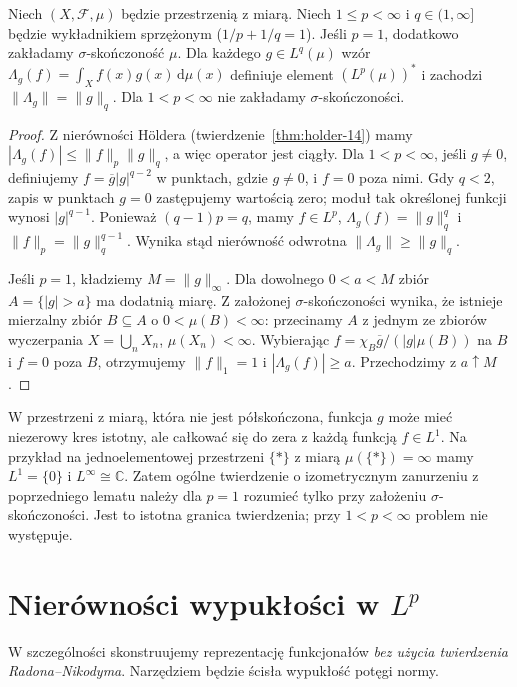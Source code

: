 \begin{lemat}
\label{lem:canonical-lpq-15}
Niech $(X,\mathcal F,\mu)$ będzie przestrzenią z miarą.
Niech $1\le p<\infty$ i $q\in(1,\infty]$ będzie wykładnikiem
sprzężonym ($1/p+1/q=1$). Jeśli $p=1$, dodatkowo
zakładamy $\sigma$-skończoność $\mu$. Dla każdego $g\in L^q(\mu)$ wzór
$\Lambda_g(f)=\int_X f(x)g(x)\,\mathrm d\mu(x)$ definiuje element
$(L^p(\mu))^*$ i zachodzi $\|\Lambda_g\|=\|g\|_q$.
Dla $1<p<\infty$ nie zakładamy $\sigma$-skończoności.
\end{lemat}
\begin{proof}
Z nierówności Höldera (twierdzenie~\ref{thm:holder-14}) mamy
$|\Lambda_g(f)|\le\|f\|_p\|g\|_q$, a więc operator jest ciągły.
Dla $1<p<\infty$, jeśli $g\ne0$, definiujemy
$f=\overline{g}|g|^{q-2}$ w punktach, gdzie $g\ne0$, i $f=0$
poza nimi. Gdy $q<2$, zapis w punktach $g=0$ zastępujemy wartością zero;
moduł tak określonej funkcji wynosi $|g|^{q-1}$.
Ponieważ $(q-1)p=q$, mamy $f\in L^p$,
$\Lambda_g(f)=\|g\|_q^q$ i $\|f\|_p=\|g\|_q^{q-1}$.
Wynika stąd nierówność odwrotna $\|\Lambda_g\|\ge\|g\|_q$.

Jeśli $p=1$, kładziemy $M=\|g\|_\infty$. Dla dowolnego
$0<a<M$ zbiór $A=\{|g|>a\}$ ma dodatnią miarę.
Z założonej $\sigma$-skończoności wynika, że istnieje
mierzalny zbiór $B\subseteq A$ o $0<\mu(B)<\infty$:
przecinamy $A$ z jednym ze zbiorów wyczerpania
$X=\bigcup_nX_n$, $\mu(X_n)<\infty$.
Wybierając $f=\chi_B\overline g/(|g|\mu(B))$ na $B$
i $f=0$ poza $B$, otrzymujemy $\|f\|_1=1$ i
$|\Lambda_g(f)|\ge a$. Przechodzimy z $a\uparrow M$.
\end{proof}

\begin{uwaga}[Dlaczego wymagane jest doprecyzowanie dla $p=1$?]
W przestrzeni z miarą, która nie jest półskończona, funkcja $g$
może mieć niezerowy kres istotny, ale całkować się do zera
z każdą funkcją $f\in L^1$. Na przykład na jednoelementowej
przestrzeni $\{*\}$ z miarą $\mu(\{*\})=\infty$ mamy
$L^1=\{0\}$ i $L^\infty\cong\mathbb C$.
Zatem ogólne twierdzenie o izometrycznym zanurzeniu z poprzedniego
lematu należy dla $p=1$ rozumieć tylko przy założeniu
$\sigma$-skończoności. Jest to istotna granica twierdzenia;
przy $1<p<\infty$ problem nie występuje.
\end{uwaga}

\section{Nierówności wypukłości w \texorpdfstring{$L^p$}{L\string^p}}
W szczególności skonstruujemy reprezentację funkcjonałów
\emph{bez użycia twierdzenia Radona--Nikodyma}. Narzędziem
będzie ścisła wypukłość potęgi normy.


